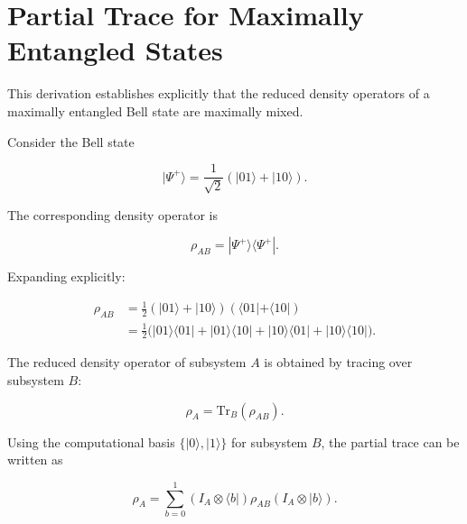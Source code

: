 
\section{Partial Trace for Maximally Entangled States}

This derivation establishes explicitly that the reduced density operators of a maximally entangled Bell state are maximally mixed.

\medskip

Consider the Bell state

\begin{equation}
|\Psi^+\rangle
=
\frac{1}{\sqrt{2}}
\left(
|01\rangle + |10\rangle
\right).
\label{eq:bell_state_psiplus_derivation}
\end{equation}

The corresponding density operator is

\begin{equation}
\rho_{AB}
=
|\Psi^+\rangle \langle \Psi^+|.
\label{eq:bell_density_operator_derivation}
\end{equation}

Expanding explicitly:

\begin{align}
\rho_{AB}
&=
\frac{1}{2}
\left(
|01\rangle + |10\rangle
\right)
\left(
\langle 01| + \langle 10|
\right)
\nonumber
\\
&=
\frac{1}{2}
\Big(
|01\rangle \langle 01|
+
|01\rangle \langle 10|
+
|10\rangle \langle 01|
+
|10\rangle \langle 10|
\Big).
\label{eq:bell_density_expansion}
\end{align}

\medskip

The reduced density operator of subsystem \( A \) is obtained by tracing over subsystem \( B \):

\begin{equation}
\rho_A
=
\mathrm{Tr}_B(\rho_{AB}).
\label{eq:partial_trace_definition_derivation}
\end{equation}

Using the computational basis \( \{|0\rangle, |1\rangle\} \) for subsystem \( B \), the partial trace can be written as

\begin{equation}
\rho_A
=
\sum_{b=0}^{1}
(I_A \otimes \langle b|)
\rho_{AB}
(I_A \otimes |b\rangle).
\label{eq:partial_trace_computational_basis}
\end{equation}

